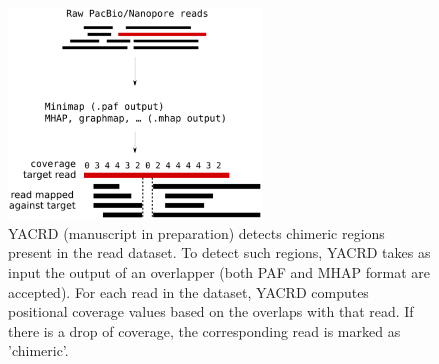 \documentclass[../../main.tex]{subfiles}
\begin{document}
\begin{figure}[!htbp]
    \centering
    \includegraphics[width=0.6\textwidth]{supplemental/knot/yacrd.pdf}
    \caption{YACRD (manuscript in preparation) detects chimeric regions present in the read dataset. To detect such regions, YACRD takes as input the output of an overlapper (both PAF and MHAP format are accepted). For each read in the dataset, YACRD computes positional coverage values based on the overlaps with that read. If there is a drop of coverage, the corresponding read is marked as 'chimeric'.}
    \label{fig:appendix:yacrd}
\end{figure}
\end{document}
